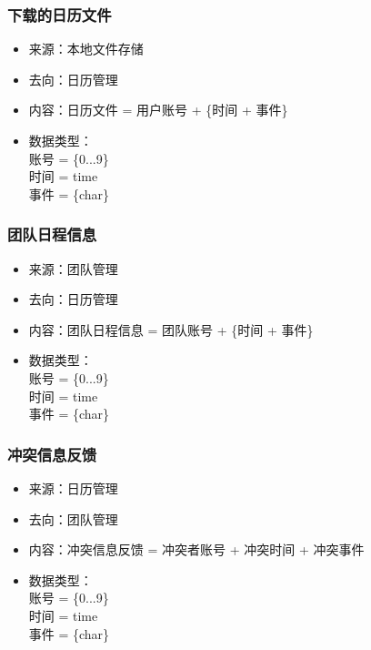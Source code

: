             \subsubsection{下载的日历文件}
            \begin{itemize}
            \item 来源：本地文件存储
            \item 去向：日历管理
            \item 内容：日历文件 = 用户账号 + \{时间 + 事件\}
            \item 数据类型：\\
            账号 = \{0...9\}\\
            时间 = time\\
            事件 = \{char\}\\
            \end{itemize}
            \subsubsection{团队日程信息}
            \begin{itemize}
            \item 来源：团队管理
            \item 去向：日历管理
            \item 内容：团队日程信息 = 团队账号 + \{时间 + 事件\}
            \item 数据类型：\\
            账号 = \{0...9\}\\
            时间 = time\\
            事件 = \{char\}\\
            \end{itemize}

            \subsubsection{冲突信息反馈}
            \begin{itemize}
            \item 来源：日历管理
            \item 去向：团队管理
            \item 内容：冲突信息反馈 = {冲突者账号 + 冲突时间 + 冲突事件}
            \item 数据类型：\\
            账号 = \{0...9\}\\
            时间 = time\\
            事件 = \{char\}\\
            \end{itemize}
